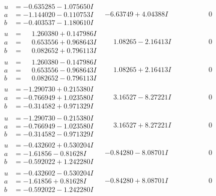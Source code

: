 \documentclass[1p]{elsarticle_modified}
\theoremstyle{definition}
\begin{document}
$$\begin{array}{c|c|c}
\begin{aligned}
u &= -0.635285 - 1.075650 I \\
a &= -1.144020 - 0.110753 I \\
b &= -0.403537 - 1.180610 I\end{aligned}
 & -6.63749 + 4.04388 I & \phantom{-0.000000 } 0 \\ \hline\begin{aligned}
u &= \phantom{-}1.260380 + 0.147986 I \\
a &= \phantom{-}0.653556 + 0.968643 I \\
b &= \phantom{-}0.082652 + 0.796113 I\end{aligned}
 & \phantom{-}1.08265 - 2.16413 I & \phantom{-0.000000 } 0 \\ \hline\begin{aligned}
u &= \phantom{-}1.260380 - 0.147986 I \\
a &= \phantom{-}0.653556 - 0.968643 I \\
b &= \phantom{-}0.082652 - 0.796113 I\end{aligned}
 & \phantom{-}1.08265 + 2.16413 I & \phantom{-0.000000 } 0 \\ \hline\begin{aligned}
u &= -1.290730 + 0.215380 I \\
a &= -0.766949 + 1.023580 I \\
b &= -0.314582 + 0.971329 I\end{aligned}
 & \phantom{-}3.16527 - 8.27221 I & \phantom{-0.000000 } 0 \\ \hline\begin{aligned}
u &= -1.290730 - 0.215380 I \\
a &= -0.766949 - 1.023580 I \\
b &= -0.314582 - 0.971329 I\end{aligned}
 & \phantom{-}3.16527 + 8.27221 I & \phantom{-0.000000 } 0 \\ \hline\begin{aligned}
u &= -0.432602 + 0.530204 I \\
a &= -1.61856 - 0.81628 I \\
b &= -0.592022 + 1.242280 I\end{aligned}
 & -0.84280 - 8.08701 I & \phantom{-0.000000 } 0 \\ \hline\begin{aligned}
u &= -0.432602 - 0.530204 I \\
a &= -1.61856 + 0.81628 I \\
b &= -0.592022 - 1.242280 I\end{aligned}
 & -0.84280 + 8.08701 I & \phantom{-0.000000 } 0 \\ \hline\begin{aligned}

\end{aligned}
\end{array}$$
\end{document}
